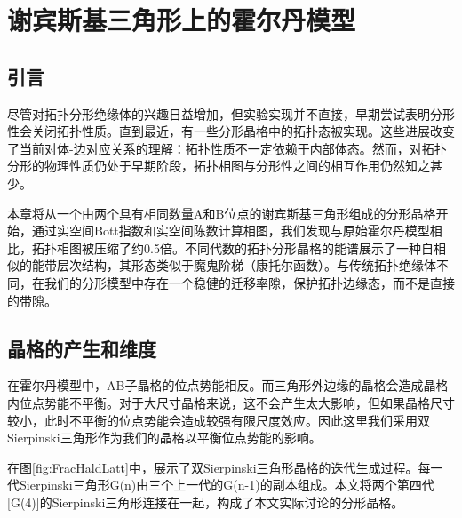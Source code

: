 \chapter{谢宾斯基三角形上的霍尔丹模型}
\section{引言}
尽管对拓扑分形绝缘体的兴趣日益增加，但实验实现并不直接，早期尝试\cite{liu2021sierpinski}表明分形性会关闭拓扑性质。直到最近，有一些分形晶格中的拓扑态被实现\cite{kempkes2019design,biesenthal2022fractal,li2023fractal,zhong2024observation,li2023fractality,LI20222040,lai2024spin,ma2023elastic,dorin2024uncovering}。这些进展改变了当前对体-边对应关系的理解：拓扑性质不一定依赖于内部体态。然而，对拓扑分形的物理性质仍处于早期阶段，拓扑相图与分形性之间的相互作用仍然知之甚少。

本章将从一个由两个具有相同数量A和B位点的谢宾斯基三角形组成的分形晶格开始，通过实空间Bott指数\cite{titum2015disorder,wang2020bosonic}和实空间陈数计算相图，我们发现与原始霍尔丹模型相比，拓扑相图被压缩了约0.5倍。不同代数的拓扑分形晶格的能谱展示了一种自相似的能带层次结构，其形态类似于魔鬼阶梯（康托尔函数）\cite{bak1986devil}。与传统拓扑绝缘体不同，在我们的分形模型中存在一个稳健的迁移率隙，保护拓扑边缘态，而不是直接的带隙。
\section{晶格的产生和维度}
在霍尔丹模型中，AB子晶格的位点势能相反。而三角形外边缘的晶格会造成晶格内位点势能不平衡。对于大尺寸晶格来说，这不会产生太大影响，但如果晶格尺寸较小，此时不平衡的位点势能会造成较强有限尺度效应。因此这里我们采用双Sierpinski三角形作为我们的晶格以平衡位点势能的影响。

在图\ref{fig:FracHaldLatt}中，展示了双Sierpinski三角形晶格的迭代生成过程。每一代Sierpinski三角形G(n)由三个上一代的G(n-1)的副本组成。本文将两个第四代[G(4)]的Sierpinski三角形连接在一起，构成了本文实际讨论的分形晶格。

